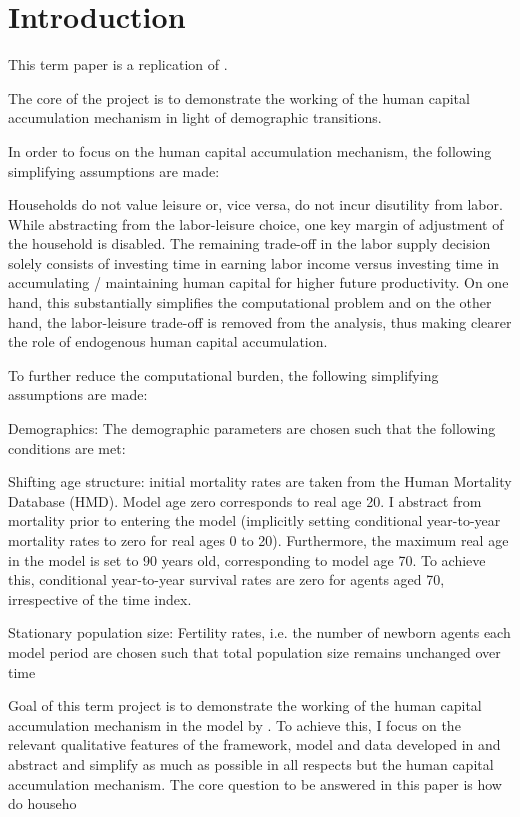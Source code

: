 \section{Introduction} %
\label{sec:introduction}

This term paper is a replication of \cite{LudwigSchelkleVogel2012}.

The core of the project is to demonstrate the working of the human capital accumulation mechanism in light of demographic transitions.

In order to focus on the human capital accumulation mechanism, the following simplifying assumptions are made:

Households do not value leisure or, vice versa, do not incur disutility from labor. While abstracting from the labor-leisure choice, one key margin of adjustment of the household is disabled. The remaining trade-off in the labor supply decision solely consists of investing time in earning labor income versus investing time in accumulating / maintaining human capital for higher future productivity. On one hand, this substantially simplifies the computational problem and on the other hand, the labor-leisure trade-off is removed from the analysis, thus making clearer the role of endogenous human capital accumulation.



To further reduce the computational burden, the following simplifying assumptions are made:


Demographics:
The demographic parameters are chosen such that the following conditions are met:


Shifting age structure:
    initial mortality rates are taken from the Human Mortality Database (HMD). Model age zero corresponds to real age 20. I abstract from mortality prior to entering the model (implicitly setting conditional year-to-year mortality rates to zero for real ages 0 to 20). Furthermore, the maximum real age in the model is set to 90 years old, corresponding to model age 70. To achieve this, conditional year-to-year survival rates are zero for agents aged 70, irrespective of the time index.

Stationary population size: Fertility rates, i.e. the number of newborn agents each model period are chosen such that total population size remains unchanged over time


Goal of this term project is to demonstrate the working of the human capital accumulation mechanism in the model by \cite{LudwigSchelkleVogel2012}. To achieve this, I focus on the relevant qualitative features of the framework, model and data developed in \cite{LudwigSchelkleVogel2012} and abstract and simplify as much as possible in all respects but the human capital accumulation mechanism. The core question to be answered in this paper is how do househo